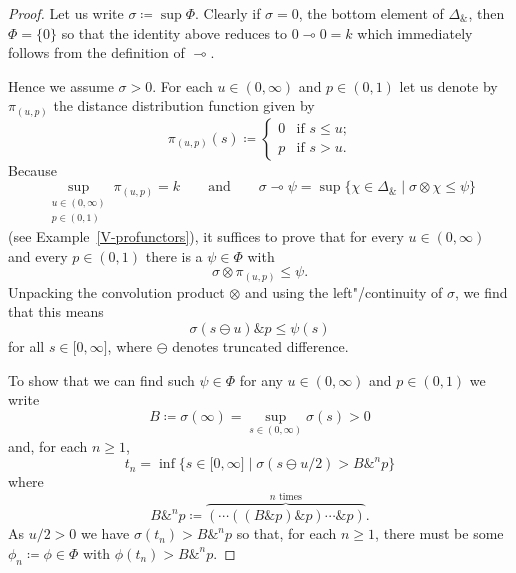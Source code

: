 \documentclass[preprint, a4paper]{elsarticle}
\newcommand{\dashcirc}{\multimap}
\theoremstyle{definition}
\theoremstyle{remark}
\providecommand{\exref}[1]{Example~\ref{#1}}
\providecommand{\dfn}{\coloneqq}
\providecommand{\tens}{\otimes}
\providecommand{\brcs}[1]{\lbrace #1 \rbrace}
\providecommand{\brks}[1]{\lbrack #1 \rbrack}
\providecommand{\set}[1]{\brcs{#1}}
\newcommand{\tn}{\mathbin\&}
\providecommand{\2}{\mathsf 2}
\begin{document}
	\begin{proof}
		Let us write $\sigma \dfn \sup\Phi$. Clearly if $\sigma = 0$, the bottom element of $\Delta_{\tn}$, then $\Phi = \set 0$ so that the identity above reduces to $0 \dashcirc 0 = k$ which immediately follows from the definition of $\dashcirc$. 
		
		Hence we assume $\sigma > 0$. For each $u \in (0, \infty)$ and $p \in (0, 1)$ let us denote by $\pi_{(u, p)}$ the distance distribution function given by
		\begin{displaymath}
			\pi_{(u, p)}(s) \dfn \begin{cases}
				0 & \text{if $s \leq u$;} \\
				p & \text{if $s > u$.}
			\end{cases}
		\end{displaymath}
		Because
		\begin{displaymath}
			\sup_{\substack{u \in (0, \infty) \\ p \in (0, 1)}} \pi_{(u, p)} = k \qquad \text{and} \qquad \sigma \dashcirc \psi = \sup \set{\chi \in \Delta_{\tn} \mid \sigma \tens \chi \leq \psi}
		\end{displaymath}
		(see \exref{V-profunctors}), it suffices to prove that for every $u \in (0, \infty)$ and every $p \in (0, 1)$ there is a $\psi \in \Phi$ with
		\begin{displaymath}
			\sigma \tens \pi_{(u, p)} \leq \psi.
		\end{displaymath}
		Unpacking the convolution product $\tens$ and using the left"/continuity of $\sigma$, we find that this means
		\begin{equation} \label{condition on psi}
			\sigma(s \ominus u) \tn p \leq \psi(s)
		\end{equation}
		for all $s \in \brks{0, \infty}$, where $\ominus$ denotes truncated difference.
		
		To show that we can find such $\psi \in \Phi$ for any $u \in (0, \infty)$ and $p \in (0, 1)$ we write
		\begin{displaymath}
			B \dfn \sigma(\infty) = \sup_{s \in (0, \infty)} \sigma(s) > 0
		\end{displaymath}
		and, for each $n \geq 1$,
		\begin{displaymath}
			t_n = \inf \set{s \in \brks{0, \infty} \mid \sigma(s \ominus u/2) > B \tn^n p}
		\end{displaymath}
		where
		\begin{displaymath}
			B \tn^n p \dfn \overbrace{(\dotsb((B \tn p) \tn p)\dotsb\tn p)}^\text{$n$ times}.
		\end{displaymath}
		As $u/2 > 0$ we have $\sigma(t_n) > B \tn^n p$ so that, for each $n \geq 1$, there must be some $\phi_n \dfn \phi \in \Phi$ with $\phi(t_n) > B \tn^n p$.
		

\end{proof}
\end{document}

